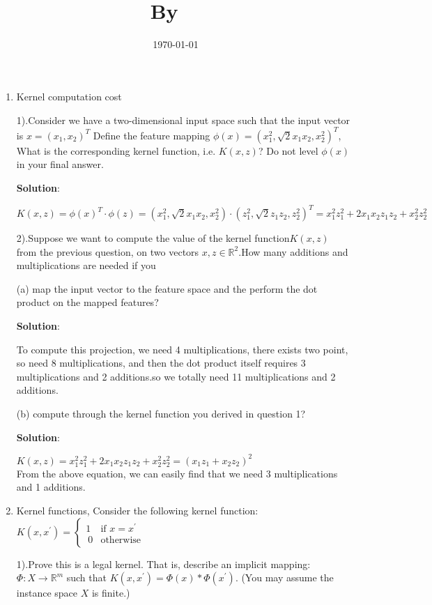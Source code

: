\documentclass{article}
\title{
    \vspace{2in}
    \textmd{\textbf{\hmwkClass\\ \hmwkTitle}}\\
    \normalsize\vspace{0.1in}\small{By\ \textit{\hmwkClassInstructor\ \hmwkClassTime }}\\
    \vspace{3in}
}
\author{\textbf{\hmwkAuthorName}}
\date{\today}
\newcommand{\solution}{\textbf{\large Solution}}
\begin{document}
	\maketitle
	\newpage
	\begin{enumerate}
		\item
		Kernel computation cost
		
		1).Consider we have a two-dimensional input space such that the input vector is $x = (x_1, x_2)^T$
		Define the feature mapping $\phi(x) = (x_1^2, \sqrt{2}x_1x_2, x_2^2)^T$, What is the corresponding kernel function,
		i.e. $K(x,z)$? Do not level $\phi(x)$ in your final answer.

		\solution:
		
		$K(x,z) = \phi(x)^T \cdot \phi(z) = (x_1^2, \sqrt{2}x_1x_2, x_2^2) \cdot (z_1^2, \sqrt{2}z_1z_2, z_2^2)^T = x_1^2z_1^2+ 2x_1x_2z_1z_2+x_2^2z_2^2$


		2).Suppose we want to compute the value of the kernel function$K(x,z)$ from the previous
		question, on two vectors $x,z \in \mathbb{R}^2$.How many additions and multiplications are needed if you 
		
		(a) map the input vector to the feature space and the perform the dot product on the mapped features?

		\solution:
		
		To compute this projection, we need 4 multiplications, there exists two point, so need 8 multiplications,
		and then the dot product itself requires 3 multiplications and 2 additions.so we totally need
		11 multiplications and 2 additions.

		(b) compute through the kernel function you derived in question 1?

		\solution:

		$K(x,z) = x_1^2z_1^2+ 2x_1x_2z_1z_2+x_2^2z_2^2 = (x_1z_1 + x_2z_2)^2$ \\
		From the above equation, we can easily find that we need 3 multiplications and 1 additions.

		\item
		Kernel functions, Consider the following kernel function: \\
		$
			K(x,x^{'})=
				\begin{cases}
				1 &\mbox{if $x=x^{'}$}\\\
				0 &\mbox{otherwise}
				\end{cases}
		$

		1).Prove this is a legal kernel. That is, describe an implicit mapping: $\Phi:X \rightarrow \mathbb{R}^m$ such that
		$ K(x, x^{'}) = \Phi(x) * \Phi(x^{'})$. (You may assume the instance space $X$ is finite.)
		

\end{enumerate}
\end{document}
